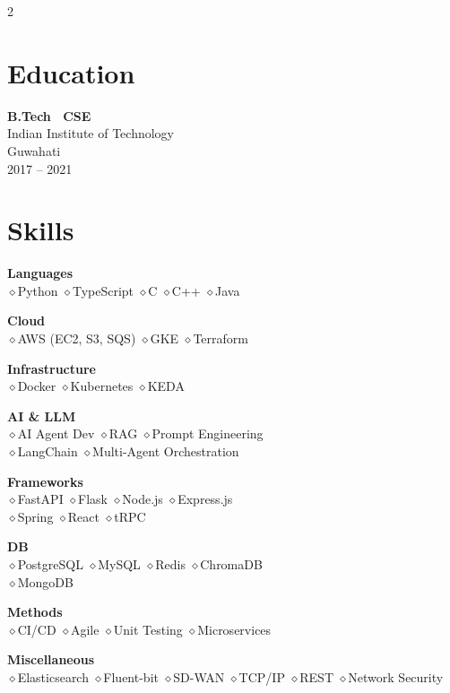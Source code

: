 \documentclass[10pt,a4paper]{article}
\newcommand{\emptydiamond}[0]{\space$\diamond$\space}
\begin{document}
\begin{paracol}{2}
\section{Education}
\textbf{B.Tech \textbullet\ CSE}\\
{\small Indian Institute of Technology\\Guwahati}\\
{\footnotesize\color{darkgray} 2017 – 2021}
\vspace{6pt}
\section{Skills}
\textbf{Languages}\\
{\small \emptydiamond Python \emptydiamond TypeScript \emptydiamond C \emptydiamond C++ \emptydiamond Java}\par\vspace{3pt}
\textbf{Cloud}\\
{\small \emptydiamond AWS (EC2, S3, SQS) \emptydiamond GKE \emptydiamond Terraform}\par\vspace{3pt}
\textbf{Infrastructure}\\
{\small \emptydiamond Docker \emptydiamond Kubernetes \emptydiamond KEDA }\par\vspace{3pt}
\textbf{AI \& LLM}\\
{\small \emptydiamond AI Agent Dev \emptydiamond RAG
\emptydiamond Prompt Engineering \\ \emptydiamond LangChain \emptydiamond Multi-Agent Orchestration}\par\vspace{3pt}
\textbf{Frameworks}\\
{\small \emptydiamond FastAPI \emptydiamond Flask \emptydiamond Node.js \emptydiamond Express.js \\
\emptydiamond Spring \emptydiamond React \emptydiamond tRPC}\par\vspace{3pt}
\textbf{DB}\\
{\small \emptydiamond PostgreSQL \emptydiamond MySQL \emptydiamond Redis \emptydiamond ChromaDB \\
\emptydiamond MongoDB }\par\vspace{3pt}
\textbf{Methods}\\
{\small \emptydiamond CI/CD \emptydiamond Agile \emptydiamond Unit Testing \emptydiamond Microservices}\par\vspace{3pt}
\textbf{Miscellaneous}\\
{\small \emptydiamond Elasticsearch \emptydiamond Fluent-bit \emptydiamond SD-WAN \emptydiamond TCP/IP \emptydiamond REST \emptydiamond Network Security}
\vspace{6pt}

\end{paracol}
\end{document}
